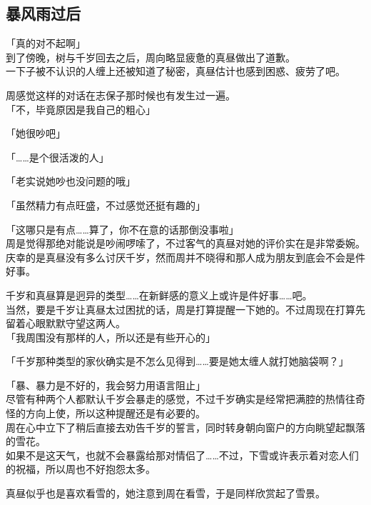 \subsection{暴风雨过后}

「真的对不起啊」\\

到了傍晚，树与千岁回去之后，周向略显疲惫的真昼做出了道歉。\\

一下子被不认识的人缠上还被知道了秘密，真昼估计也感到困惑、疲劳了吧。

周感觉这样的对话在志保子那时候也有发生过一遍。\\

「不，毕竟原因是我自己的粗心」

「她很吵吧」

「……是个很活泼的人」

「老实说她吵也没问题的哦」

「虽然精力有点旺盛，不过感觉还挺有趣的」

「这哪只是有点……算了，你不在意的话那倒没事啦」\\

周是觉得那绝对能说是吵闹啰嗦了，不过客气的真昼对她的评价实在是非常委婉。\\

庆幸的是真昼没有多么讨厌千岁，然而周并不晓得和那人成为朋友到底会不会是件好事。

千岁和真昼算是迥异的类型……在新鲜感的意义上或许是件好事……吧。\\

当然，要是千岁让真昼太过困扰的话，周是打算提醒一下她的。不过周现在打算先留着心眼默默守望这两人。\\

「我周围没有那样的人，所以还是有些开心的」

「千岁那种类型的家伙确实是不怎么见得到……要是她太缠人就打她脑袋啊？」

「暴、暴力是不好的，我会努力用语言阻止」\\

尽管有种两个人都默认千岁会暴走的感觉，不过千岁确实是经常把满腔的热情往奇怪的方向上使，所以这种提醒还是有必要的。\\

周在心中立下了稍后直接去劝告千岁的誓言，同时转身朝向窗户的方向眺望起飘落的雪花。\\

如果不是这天气，也就不会暴露给那对情侣了……不过，下雪或许表示着对恋人们的祝福，所以周也不好抱怨太多。

真昼似乎也是喜欢看雪的，她注意到周在看雪，于是同样欣赏起了雪景。\\

